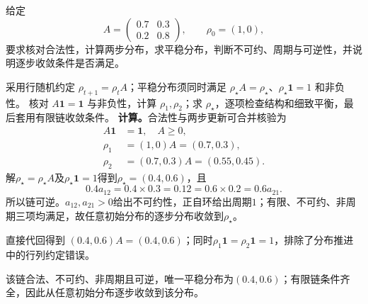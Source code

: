 \label{struct:V5-C01-CH32}
\begin{example}[一条两状态链的完整审计]\label{exm:V5-C01-two-state-audit}
给定
\[
A=\begin{pmatrix}0.7&0.3\\0.2&0.8\end{pmatrix},\qquad \rho_0=(1,0),
\]
要求核对合法性，计算两步分布，求平稳分布，判断不可约、周期与可逆性，并说明逐步收敛条件是否满足。
\end{example}

\label{struct:V5-C01-CH33}
\begin{solution}
\SolGiven 采用行随机约定 $\rho_{t+1}=\rho_tA$；平稳分布须同时满足 $\rho_\star A=\rho_\star$、$\rho_\star\boldsymbol1=1$ 和非负性。
\SolPlan 核对 $A\boldsymbol1=\boldsymbol1$ 与非负性，计算 $\rho_1,\rho_2$；求 $\rho_\star$，逐项检查结构和细致平衡，最后套用有限链收敛条件。
\SolDerive
\textbf{计算。}合法性与两步更新可合并核验为
\[
\begin{aligned}
A\boldsymbol 1&=\boldsymbol 1,\quad A\ge0,\\
\rho_1&=(1,0)A=(0.7,0.3),\\
\rho_2&=(0.7,0.3)A=(0.55,0.45).
\end{aligned}
\]
解$\rho_\star=\rho_\star A$及$\rho_\star\boldsymbol1=1$得到$\rho_\star=(0.4,0.6)$，且
\[
0.4a_{12}=0.4\times0.3=0.12
=0.6\times0.2=0.6a_{21}.
\]
所以链可逆。$a_{12},a_{21}>0$给出不可约性，正自环给出周期$1$；有限、不可约、非周期三项均满足，故任意初始分布的逐步分布收敛到$\rho_\star$。

\SolCheck 直接代回得到
$(0.4,0.6)A=(0.4,0.6)$；同时$\rho_1\boldsymbol1=\rho_2\boldsymbol1=1$，排除了分布推进中的行列约定错误。

\SolAnswer 该链合法、不可约、非周期且可逆，唯一平稳分布为$(0.4,0.6)$；有限链条件齐全，因此从任意初始分布逐步收敛到该分布。
\end{solution}

